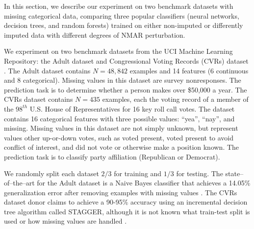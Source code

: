 \documentclass[10pt]{book}
\theoremstyle{definition}
\begin{document}
\par


\setcounter{chapter}{3}
\setcounter{equation}{0} %

In this section, we describe our experiment on two benchmark datasets with missing categorical data, comparing three popular classifiers (neural networks, decision trees, and random forests) trained on either non-imputed or differently imputed data with different degrees of NMAR perturbation.


We experiment on two benchmark datasets from the UCI Machine Learning Repository: the Adult dataset and Congressional Voting Records (CVRs) dataset \citep{Lichman2013}. The Adult dataset contains $N=48,842$ examples and 14 features (6 continuous and 8 categorical). Missing values in this dataset are survey nonresponses. The prediction task is to determine whether a person makes over \$50,000 a year. The CVRs dataset contains $N=435$ examples, each the voting record of a member of the $98^{th}$ U.S. House of Representatives for 16 key roll call votes. The dataset contains 16 categorical features with three possible values: ``yea'', ``nay'', and missing. Missing values in this dataset are not simply unknown, but represent values other up-or-down votes, such as voted present, voted present to avoid conflict of interest, and did not vote or otherwise make a position known. The prediction task is to classify party affiliation (Republican or Democrat). 

We randomly split each dataset $2/3$ for training and $1/3$ for testing. The state--of--the--art for the Adult dataset is a Naive Bayes classifier that achieves a 14.05\% generalization error after removing examples with missing values \citep{kohavi1996}. The CVRs dataset donor claims to achieve a 90-95\% accuracy using an incremental decision tree algorithm called STAGGER, although it is not known what train-test split is used or how missing values are handled \citep{schlimmer1987,schlimmer1986}.

\par
{}
\end{document}
